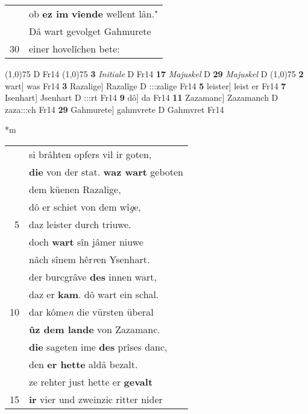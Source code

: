 \documentclass[8pt,a4paper,notitlepage]{article}
\begin{document}
\begin{table}[ht]
\begin{minipage}[t]{0.5\linewidth}
\begin{tabular}{rl}
 & ob \textbf{ez im} \textbf{vîende} wellent lân."\\ 
 & Dâ wart gevolget Gahmurete\\ 
30 & einer hovelîchen bete:\\ 
\end{tabular}
\scriptsize
\line(1,0){75} \newline
D Fr14 \newline
\line(1,0){75} \newline
\textbf{3} \textit{Initiale} D Fr14  \textbf{17} \textit{Majuskel} D  \textbf{29} \textit{Majuskel} D  \newline
\line(1,0){75} \newline
\textbf{2} wart] was Fr14 \textbf{3} Razalige] Razalîge D :::zalige Fr14 \textbf{5} leister] leist er Fr14 \textbf{7} Isenhart] Jsenhart D :::rt Fr14 \textbf{9} dô] da Fr14 \textbf{11} Zazamanc] Zazamanch D zaza:::ch Fr14 \textbf{29} Gahmurete] gahmvrete D Gahmvret Fr14 \newline
\end{minipage}
\hspace{0.5cm}
\begin{minipage}[t]{0.5\linewidth}
\small
\begin{center}*m
\end{center}
\begin{tabular}{rl}
 & si brâhten opfers vil ir goten,\\ 
 & \textbf{die} von der stat. \textbf{waz wart} geboten\\ 
 & dem küenen Razalige,\\ 
 & dô er schiet von dem wî\textit{g}e,\\ 
5 & daz leister durch triuwe.\\ 
 & doch \textbf{wart} sîn jâmer niuwe\\ 
 & nâch sînem hêr\textit{r}en Ysenhart.\\ 
 & der burcgrâve \textbf{des} innen wart,\\ 
 & daz er \textbf{kam}. dô wart ein schal.\\ 
10 & dar kôme\textit{n} die vürsten überal\\ 
 & \textbf{ûz dem lande} von Zazamanc.\\ 
 & \textbf{die} sageten ime \textbf{des} prîses danc,\\ 
 & den \textbf{er hette} aldâ bezalt.\\ 
 & ze rehter just hette er \textbf{gevalt}\\ 
15 & \textbf{ir} vier und zweinzic ritter nider\\ 

\end{tabular}
\end{minipage}
\end{table}
\end{document}
